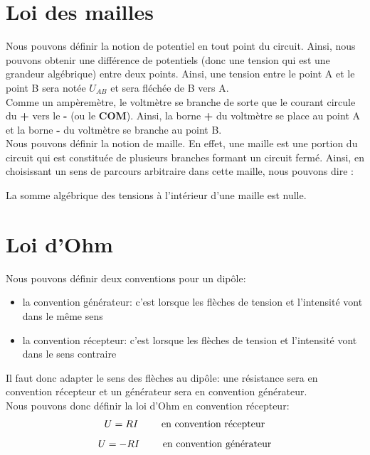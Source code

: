 \documentclass[11pt,a4paper,openany]{book}
\begin{document}
\section{Loi des mailles}

Nous pouvons définir la notion de potentiel en tout point du circuit. Ainsi, nous pouvons obtenir une différence de potentiels (donc une tension qui est une grandeur algébrique) entre deux points. Ainsi, une tension entre le point A et le point B sera notée $ U_{AB} $ et sera fléchée de B vers A.\\
Comme un ampèremètre, le voltmètre se branche de sorte que le courant circule du \textbf{+} vers le \textbf{-} (ou le \textbf{COM}). Ainsi, la borne \textbf{+} du voltmètre se place au point A et la borne \textbf{-} du voltmètre se branche au point B.\\
Nous pouvons définir la notion de maille. En effet, une maille est une portion du circuit qui est constituée de plusieurs branches formant un circuit fermé. Ainsi, en choisissant un sens de parcours arbitraire dans cette maille, nous pouvons dire :
\begin{Definition}
La somme algébrique des tensions à l'intérieur d'une maille est nulle.
\end{Definition} 

\newpage

\section{Loi d'Ohm}

Nous pouvons définir deux conventions pour un dipôle:
\begin{itemize}
\item la convention générateur: c'est lorsque les flèches de tension et l'intensité vont dans le même sens
\item la convention récepteur: c'est lorsque les flèches de tension et l'intensité vont dans le sens contraire
\end{itemize}

Il faut donc adapter le sens des flèches au dipôle: une résistance sera en convention récepteur et un générateur sera en convention générateur.\\
Nous pouvons donc définir la loi d'Ohm en convention récepteur:
\begin{equation}
U = RI \text{\hspace{20px} en convention récepteur}
\end{equation}
\begin{equation}
U = -RI \text{\hspace{20px} en convention générateur}
\end{equation}
\end{document}
